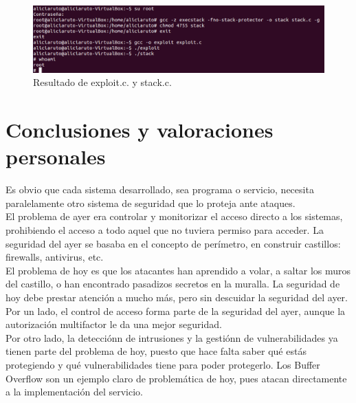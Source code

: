 \documentclass[a4,12pt,onecolum]{article}
\begin{document}


\begin{figure}[htbp]
\centering
\includegraphics[width=1.0\textwidth]{./images/BOexploit.png}
\caption{Resultado de exploit.c. y stack.c.}
\label{fig:bo4}
\end{figure}

\clearpage
\section{Conclusiones y valoraciones personales}

Es obvio que cada sistema desarrollado, sea programa o servicio, necesita paralelamente otro sistema de seguridad que lo proteja ante ataques. \\

El problema de ayer era controlar y monitorizar el acceso directo a los sistemas, prohibiendo el acceso a todo aquel que no tuviera permiso para acceder. La seguridad del ayer se basaba en el concepto de perímetro, en construir castillos: firewalls, antivirus, etc.  \\

El problema de hoy es que los atacantes han aprendido a volar, a saltar los muros del castillo, o han encontrado pasadizos secretos en la muralla. La seguridad de hoy debe prestar atención a mucho más, pero sin descuidar la seguridad del ayer. \\

Por un lado, el control de acceso forma parte de la seguridad del ayer, aunque la autorización multifactor le da una mejor seguridad. \\

Por otro lado, la detecciónn de intrusiones y la gestiónn de vulnerabilidades ya tienen parte del problema de hoy, puesto que hace falta saber qué estás protegiendo y qué vulnerabilidades tiene para poder protegerlo. Los Buffer Overflow son un ejemplo claro de problemática de hoy, pues atacan directamente a la implementación del servicio. \\
\end{document}
